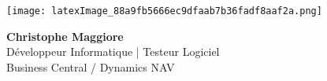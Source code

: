 \documentclass[10pt,a4paper]{article}
\begin{document}
\noindent\small
\colorbox{CouleurSection}{
    \begin{minipage}[t]{0.2\textwidth}
        \vspace{0pt} %
        \texttt{[image: latexImage\_88a9fb5666ec9dfaab7b36fadf8aaf2a.png]}
    \end{minipage}
    \begin{minipage}[t]{0.78\textwidth} 
        \vspace{15pt} %
        {\Huge \textbf{\textcolor{blanc}Christophe Maggiore}}\\
        \vspace{10pt}
        {\LARGE \textcolor{blanc}Développeur Informatique | Testeur Logiciel}\\
        \vspace{3pt}
        {\large  \textcolor{blanc}Business Central / Dynamics NAV}
    \end{minipage}
}
\noindent{}
\end{document}
